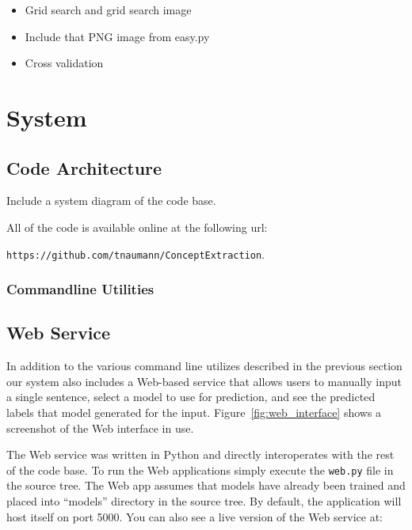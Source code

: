 \documentclass[preprint]{style}
\begin{document}
\begin{itemize}

\item Grid search and grid search image

\item Include that PNG image from easy.py

\item Cross validation

\end{itemize}




\section{System}

\subsection{Code Architecture}

Include a system diagram of the code base.

All of the code is available online at the following url:

{\tt https://github.com/tnaumann/ConceptExtraction}.

\subsubsection{Commandline Utilities}

\subsection{Web Service}

In addition to the various command line utilizes described in the previous section our system also includes a Web-based service that allows users to manually input a single sentence, select a model to use for prediction, and see the predicted labels that model generated for the input. Figure~\ref{fig:web_interface} shows a screenshot of the Web interface in use.

The Web service was written in Python and directly interoperates with the rest of the code base. To run the Web applications simply execute the {\tt web.py} file in the source tree. The Web app assumes that models have already been trained and placed into ``models'' directory in the source tree. By default, the application will host itself on port 5000. You can also see a live version of the Web service at:
\end{document}
